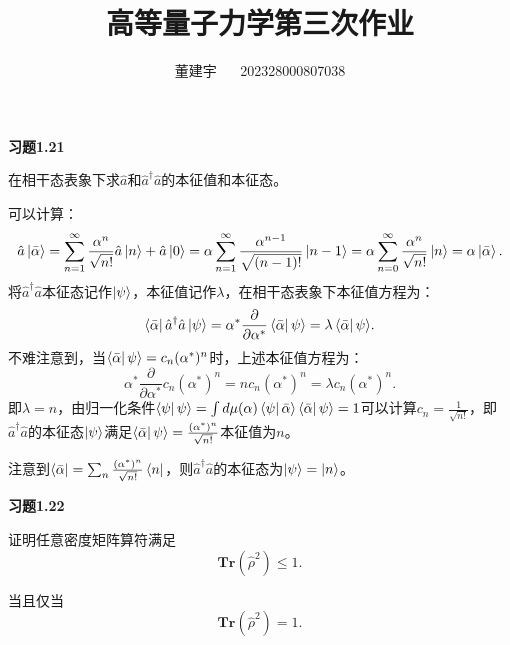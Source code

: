 \documentclass[reqno,a4paper,12pt]{amsart}
\title{高等量子力学第三次作业}
\author{董建宇 ~~ 202328000807038}
\begin{document}
\maketitle
\titleformat{\section}[hang]{\small}{\thesection}{0.8em}{}{}
\titleformat{\subsection}[hang]{\small}{\thesubsection}{0.8em}{}{}

\textbf{习题1.21}

在相干态表象下求$\hat{a}$和$\hat{a}^\dagger\hat{a}$的本征值和本征态。
\begin{tcolorbox}[breakable, colback = black!5!white, colframe = black]
可以计算：
\[
	\hat{a} \ket{\bar{\alpha}} = \sum_{n=1}^{\infty} \frac{\alpha^n}{\sqrt{n!}} \hat{a} \ket{n} + \hat{a} \ket{0} = \alpha \sum_{n=1}^\infty \frac{\alpha^{n-1}}{\sqrt{(n-1)!}} \ket{n-1} = \alpha \sum_{n=0}^\infty \frac{\alpha^n}{\sqrt{n!}} \ket{n} = \alpha \ket{\bar{\alpha}}.
\]
将$\hat{a}^\dagger\hat{a}$本征态记作$\ket{\psi}$，本征值记作$\lambda$，在相干态表象下本征值方程为：
\[
	\bra{\bar{\alpha}} \hat{a}^\dagger\hat{a} \ket{\psi} = \alpha^* \frac{\partial}{\partial \alpha^*} \bra{\bar{\alpha}} \psi \rangle = \lambda \bra{\bar{\alpha}} \psi \rangle.
\]
不难注意到，当$\bra{\bar{\alpha}} \psi \rangle = c_n (\alpha^*)^{n}$时，上述本征值方程为：
\[
	\alpha^* \frac{\partial}{\partial \alpha^*} c_n (\alpha^*)^{n} = nc_n (\alpha^*)^{n} = \lambda c_n (\alpha^*)^{n}.
\]
即$\lambda = n$，由归一化条件$\bra{\psi}\psi\rangle = \int d\mu(\alpha) \bra{\psi} \bar{\alpha}\rangle \bra{\bar{\alpha}} \psi\rangle = 1$可以计算$c_n = \frac{1}{\sqrt{n!}}$，即$\hat{a}^\dagger\hat{a}$的本征态$\ket{\psi}$满足$\bra{\bar{\alpha}} \psi \rangle = \frac{(\alpha^*)^n}{\sqrt{n!}}$本征值为$n$。

注意到$\bra{\bar{\alpha}} = \sum_{n} \frac{(\alpha^*)^n}{\sqrt{n!}}\bra{n}$，则$\hat{a}^\dagger\hat{a}$的本征态为$\ket{\psi} = \ket{n}$。

\end{tcolorbox}

\textbf{习题1.22}

证明任意密度矩阵算符满足
\[
	\mathbf{Tr}(\hat{\rho}^2) \leq 1.
\]

当且仅当
\[
	\mathbf{Tr}(\hat{\rho}^2) = 1.
\]
\end{document}
